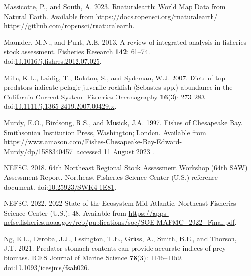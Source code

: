 \documentclass[
]{article}
\newlength{\cslhangindent}
\newlength{\cslentryspacingunit} %
\newenvironment{CSLReferences}[2] %
 {%
  \setlength{\parindent}{0pt}
  \ifodd #1
  \let\oldpar\par
  \def\par{\hangindent=\cslhangindent\oldpar}
  \fi
  \setlength{\parskip}{#2\cslentryspacingunit}
 }%
 {}
\begin{document}
\begin{CSLReferences}{1}{0}
\leavevmode{}%
Massicotte, P., and South, A. 2023. Rnaturalearth: {World} {Map} {Data} from {Natural} {Earth}. Available from \href{https://docs.ropensci.org/rnaturalearth/\%20https://github.com/ropensci/rnaturalearth}{https://docs.ropensci.org/rnaturalearth/ https://github.com/ropensci/rnaturalearth}.

\leavevmode{}%
Maunder, M.N., and Punt, A.E. 2013. A review of integrated analysis in fisheries stock assessment. Fisheries Research \textbf{142}: 61--74. doi:\href{https://doi.org/10.1016/j.fishres.2012.07.025}{10.1016/j.fishres.2012.07.025}.

\leavevmode{}%
Mills, K.L., Laidig, T., Ralston, S., and Sydeman, W.J. 2007. Diets of top predators indicate pelagic juvenile rockfish ({Sebastes} spp.) abundance in the {California} {Current} {System}. Fisheries Oceanography \textbf{16}(3): 273--283. doi:\href{https://doi.org/10.1111/j.1365-2419.2007.00429.x}{10.1111/j.1365-2419.2007.00429.x}.

\leavevmode{}%
Murdy, E.O., Birdsong, R.S., and Musick, J.A. 1997. Fishes of {Chesapeake} {Bay}. Smithsonian Institution Press, Washington; London. Available from \url{https://www.amazon.com/Fishes-Chesapeake-Bay-Edward-Murdy/dp/1588340457} {[}accessed 11 August 2023{]}.

\leavevmode{}%
NEFSC. 2018. 64th {Northeast} {Regional} {Stock} {Assessment} {Workshop} (64th {SAW}) {Assessment} {Report}. Northeast Fisheries Science Center (U.S.) reference document. doi:\href{https://doi.org/10.25923/SWK4-1E81}{10.25923/SWK4-1E81}.

\leavevmode{}%
NEFSC. 2022. 2022 {State} of the {Ecosystem} {Mid}-{Atlantic}. Northeast Fisheries Science Center (U.S.): 48. Available from \url{https://apps-nefsc.fisheries.noaa.gov/rcb/publications/soe/SOE-MAFMC_2022_Final.pdf}.

\leavevmode{}%
Ng, E.L., Deroba, J.J., Essington, T.E., Grüss, A., Smith, B.E., and Thorson, J.T. 2021. Predator stomach contents can provide accurate indices of prey biomass. ICES Journal of Marine Science \textbf{78}(3): 1146--1159. doi:\href{https://doi.org/10.1093/icesjms/fsab026}{10.1093/icesjms/fsab026}.


\end{CSLReferences}
\end{document}

